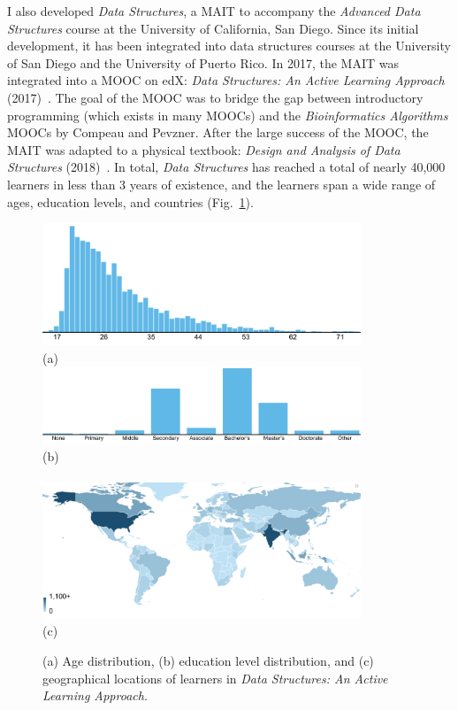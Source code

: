 I also developed \textit{Data Structures}, a \gls{MAIT} to accompany the \textit{Advanced Data Structures} course at the University of California, San Diego. Since its initial development, it has been integrated into data structures courses at the University of San Diego and the University of Puerto Rico. In 2017, the \gls{MAIT} was integrated into a \gls{MOOC} on edX: \textit{Data Structures: An Active Learning Approach} (2017)~\cite{Moshiri2017a}. The goal of the \gls{MOOC} was to bridge the gap between introductory programming (which exists in many \glspl{MOOC}) and the \textit{Bioinformatics Algorithms} \glspl{MOOC} by Compeau and Pevzner. After the large success of the \gls{MOOC}, the \gls{MAIT} was adapted to a physical textbook: \textit{Design and Analysis of Data Structures} (2018)~\cite{Moshiri2018c}. In total, \textit{Data Structures} has reached a total of nearly 40,000 learners in less than 3 years of existence, and the learners span a wide range of ages, education levels, and countries (Fig.~\ref{fig:education-learner-demographics}).

\begin{figure}
\centering
\includegraphics[width=0.85\textwidth]{figs/education-data-structures-learner-ages}\\
(a)\\
\includegraphics[width=0.85\textwidth]{figs/education-data-structures-learner-education-levels}\\
(b)\\~\\
\includegraphics[width=0.85\textwidth]{figs/education-data-structures-learner-country}\\
(c)\\
\caption[Learner Demographics]
{(a) Age distribution, (b) education level distribution, and (c) geographical locations of learners in \textit{Data Structures: An Active Learning Approach}.}
\label{fig:education-learner-demographics}
\end{figure}

